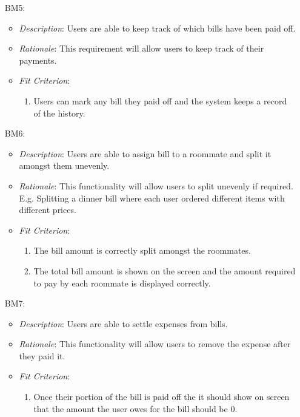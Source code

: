 \documentclass[12pt]{article}
\begin{document}
\begin{itemize}
\begin{itemize}
    \end{itemize}
    \item[BM5:] 
    \begin{itemize}
        \item \textit{Description}: Users are able to keep track of which bills have been paid off.
        \item \textit{Rationale}: This requirement will allow users to keep track of their payments.
        \item \textit{Fit Criterion}: 
        \begin{enumerate}
            \item Users can mark any bill they paid off and the system keeps a record of the history.
        \end{enumerate}
    \end{itemize}
    \item[BM6:] 
    \begin{itemize}
        \item \textit{Description}: Users are able to assign bill to a roommate and split it amongst them unevenly.
        \item \textit{Rationale}: This functionality will allow users to split unevenly if required. E.g. Splitting a dinner bill where each user ordered different items with different prices.
        \item \textit{Fit Criterion}: 
        \begin{enumerate}
            \item The bill amount is correctly split amongst the roommates.
            \item The total bill amount is shown on the screen and the amount required to pay by each roommate is displayed correctly.
        \end{enumerate}
    \end{itemize}
    \item[BM7:] 
    \begin{itemize}
        \item \textit{Description}: Users are able to settle expenses from bills.
        \item \textit{Rationale}: This functionality will allow users to remove the expense after they paid it.
        \item \textit{Fit Criterion}: 
        \begin{enumerate}
            \item Once their portion of the bill is paid off the it should show on screen that the amount the user owes for the bill should be 0.
        \end{enumerate}
    \end{itemize}
\end{itemize}
\end{document}
